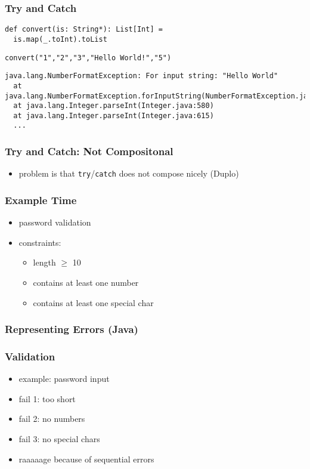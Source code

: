 \documentclass{beamer}
\begin{document}
\begin{frame}[fragile]
  \frametitle{Try and Catch}
\begin{verbatim}
def convert(is: String*): List[Int] =
  is.map(_.toInt).toList
\end{verbatim}

\begin{verbatim}
convert("1","2","3","Hello World!","5")
\end{verbatim}
\begin{verbatim}
java.lang.NumberFormatException: For input string: "Hello World"
  at java.lang.NumberFormatException.forInputString(NumberFormatException.java:65)
  at java.lang.Integer.parseInt(Integer.java:580)
  at java.lang.Integer.parseInt(Integer.java:615)
  ...
\end{verbatim}
\end{frame}

\begin{frame}
  \frametitle{Try and Catch: Not Compositonal}
  \begin{itemize}
  \item problem is that \texttt{try}/\texttt{catch} does not compose
    nicely (Duplo)
  \end{itemize}
\end{frame}

\begin{frame}[fragile]
  \frametitle{Example Time}
  \begin{itemize}
  \item password validation
  \item constraints:
    \begin{itemize}
    \item length $\geq$ 10
    \item contains at least one number
    \item contains at least one special char
    \end{itemize}
  \end{itemize}
\end{frame}

\begin{frame}[fragile]
  \frametitle{Representing Errors (Java)}
\end{frame}

\begin{frame}
  \frametitle{Validation}
  \begin{itemize}
  \item example: password input
  \item fail 1: too short
  \item fail 2: no numbers
  \item fail 3: no special chars
  \item raaaaage because of sequential errors
  \end{itemize}
\end{frame}
\end{document}

